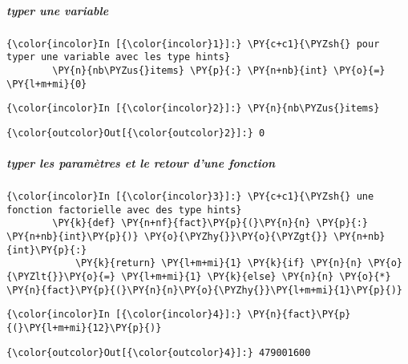     \hypertarget{typer-une-variable}{%
\subparagraph{typer une variable}\label{typer-une-variable}}

    \begin{Verbatim}[commandchars=\\\{\}]
{\color{incolor}In [{\color{incolor}1}]:} \PY{c+c1}{\PYZsh{} pour typer une variable avec les type hints}
        \PY{n}{nb\PYZus{}items} \PY{p}{:} \PY{n+nb}{int} \PY{o}{=} \PY{l+m+mi}{0}
\end{Verbatim}


    \begin{Verbatim}[commandchars=\\\{\}]
{\color{incolor}In [{\color{incolor}2}]:} \PY{n}{nb\PYZus{}items}
\end{Verbatim}


\begin{Verbatim}[commandchars=\\\{\}]
{\color{outcolor}Out[{\color{outcolor}2}]:} 0
\end{Verbatim}
            
    \hypertarget{typer-les-paramuxe8tres-et-le-retour-dune-fonction}{%
\subparagraph{typer les paramètres et le retour d'une
fonction}\label{typer-les-paramuxe8tres-et-le-retour-dune-fonction}}

    \begin{Verbatim}[commandchars=\\\{\}]
{\color{incolor}In [{\color{incolor}3}]:} \PY{c+c1}{\PYZsh{} une fonction factorielle avec des type hints}
        \PY{k}{def} \PY{n+nf}{fact}\PY{p}{(}\PY{n}{n} \PY{p}{:} \PY{n+nb}{int}\PY{p}{)} \PY{o}{\PYZhy{}}\PY{o}{\PYZgt{}} \PY{n+nb}{int}\PY{p}{:}
            \PY{k}{return} \PY{l+m+mi}{1} \PY{k}{if} \PY{n}{n} \PY{o}{\PYZlt{}}\PY{o}{=} \PY{l+m+mi}{1} \PY{k}{else} \PY{n}{n} \PY{o}{*} \PY{n}{fact}\PY{p}{(}\PY{n}{n}\PY{o}{\PYZhy{}}\PY{l+m+mi}{1}\PY{p}{)}
\end{Verbatim}


    \begin{Verbatim}[commandchars=\\\{\}]
{\color{incolor}In [{\color{incolor}4}]:} \PY{n}{fact}\PY{p}{(}\PY{l+m+mi}{12}\PY{p}{)}
\end{Verbatim}


\begin{Verbatim}[commandchars=\\\{\}]
{\color{outcolor}Out[{\color{outcolor}4}]:} 479001600
\end{Verbatim}
            
